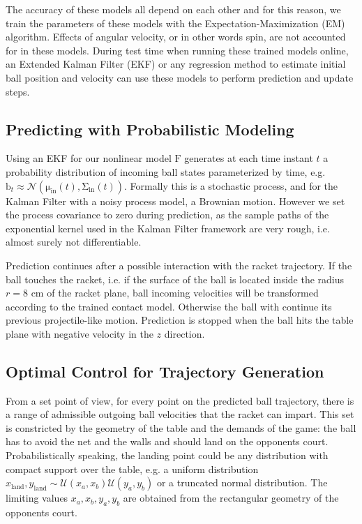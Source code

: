 \documentclass[letterpaper, 10 pt, conference]{ieeeconf}
\newcommand{\boldvec}[1]{\boldsymbol{\mathrm{#1}}}
\let\vec\boldvec
\newcommand{\ball}{\vec{b}} %
\newcommand{\ballDynamics}{\vec{F}} %
\newcommand{\racketRadius}{r} %
\begin{document}
The accuracy of these models all depend on each other and for this reason, we train the parameters of these models with the Expectation-Maximization (EM) algorithm. Effects of angular velocity, or in other words spin, are not accounted for in these models. During test time when running these trained models online, an Extended Kalman Filter (EKF) or any regression method to estimate initial ball position and velocity can use these models to perform prediction and update steps.

\subsection{Predicting with Probabilistic Modeling}

Using an EKF for our nonlinear model $\ballDynamics$ generates at each time instant $t$ a probability distribution of incoming ball states parameterized by time, e.g. $\ball_t \approx \mathcal{N}(\vec{\mu}_{\textrm{in}}(t),\vec{\Sigma}_{\textrm{in}}(t))$. Formally this is a stochastic process, and for the Kalman Filter with a noisy process model, a Brownian motion. However we set the process covariance to zero during prediction, as the sample paths of the exponential kernel used in the Kalman Filter framework are very rough, i.e. almost surely not differentiable.

Prediction continues after a possible interaction with the racket trajectory. If the ball touches the racket, i.e. if the surface of the ball is located inside the radius $\racketRadius = 8$ cm of the racket plane, ball incoming velocities will be transformed according to the trained contact model. Otherwise the ball with continue its previous projectile-like motion. Prediction is stopped when the ball hits the table plane with negative velocity in the $z$ direction.

\subsection{Optimal Control for Trajectory Generation}

From a set point of view, for every point on the predicted ball trajectory, there is a range of admissible outgoing ball velocities that the racket can impart. This set is constricted by the geometry of the table and the demands of the game: the ball has to avoid the net and the walls and should land on the opponents court. Probabilistically speaking, the landing point could be any distribution with compact support over the table, e.g. a uniform distribution $x_{\textrm{land}}, y_{\textrm{land}} \sim \mathcal{U}(x_{a},x_{b})\mathcal{U}(y_{a},y_{b})$ or a truncated normal distribution. The limiting values $x_{a},x_{b},y_{a},y_{b}$ are obtained from the rectangular geometry of the opponents court.
%
\end{document}
